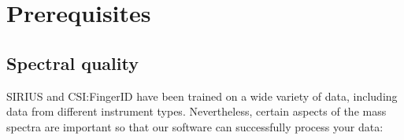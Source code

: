 \documentclass[letterpaper,10pt,openany,oneside]{sphinxmanual}
\begin{document}
  

\chapter{Prerequisites}\label{gui::prerequisites}

\section{Spectral quality}

SIRIUS and CSI:FingerID have been trained on a wide variety of data,
including data from different instrument types.  Nevertheless, certain
aspects of the mass spectra are important so that our software can
successfully process your data:
%
\end{document}
